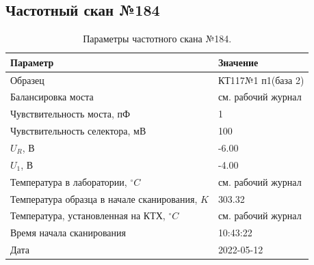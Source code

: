 \subsection{Частотный скан №184}
\begin{table}[!ht]
    \centering
    \caption{Параметры частотного скана №184.}
    \begin{tabular}{|l|l|}
        \hline
        Параметр                                       & Значение                  \\ \hline
        Образец                                        & КТ117№1 п1(база 2)        \\ \hline
        Балансировка моста                             & см. рабочий журнал        \\ \hline
        Чувствительность моста, пФ                     & 1                         \\ \hline
        Чувствительность селектора, мВ                 & 100                       \\ \hline
        $U_R$, В                                       & -6.00                     \\ \hline
        $U_1$, В                                       & -4.00                     \\ \hline
        Температура в лаборатории, $^\circ C$          & см. рабочий журнал        \\ \hline
        Температура образца в начале сканирования, $K$ & 303.32                    \\ \hline
        Температура, установленная на КТХ, $^\circ C$  & см. рабочий журнал        \\ \hline
        Время начала сканирования                      & 10:43:22                  \\ \hline
        Дата                                           & 2022-05-12                \\ \hline
    \end{tabular}
    \label{table:frequency_scan_184}
\end{table}

